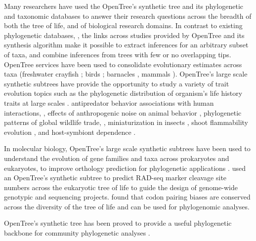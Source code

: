 \documentclass[oupdraft]{sysbio_sse}
\begin{document}
Many researchers have used the OpenTree's synthetic tree and its phylogenetic and taxonomic databases to answer their research questions across the breadth of both the tree of life, and of biological research domains.
In contrast to existing phylogenetic databases, \citep{piel2000treebase}, the links across studies provided by OpenTree and its synthesis algorithm make it possible to extract inferences for an arbitrary subset of taxa, and combine inferences from trees with few or no overlapping tips.
OpenTree services have been used to consolidate evolutionary estimates across taxa (freshwater crayfish \citep{owen2015synthetic}; birds \citep{brown2017development}; barnacles \citep{ewers2019towards, ewers2019testing}, mammals \citep{uyeda2017evolution}).
OpenTree's large scale synthetic subtrees have provide the opportunity to study
a variety of trait evolution topics such as the phylogenetic distribution of organism's life history traits at large scales \citep{tarka2018sex, healy2019animal, capdevila2020longevity}.
antipredator behavior associations with human interactions, \citep{geffroy2020evolutionary}, effects of anthropogenic noise on
animal behavior  \citep{kunc2019effects}, phylogenetic patterns of global wildlife trade,  \citep{fukushima2020global},  miniaturization in insects \citep{polilov2017scaling},
shoot flammability evolution \citep{cui2020shoot}, and host-symbiont dependence \citep{fisher2017evolution}.

In molecular biology, OpenTree's large scale synthetic subtrees
have been used to understand the evolution of gene families and taxa across prokaryotes and eukaryotes, to improve orthology prediction for phylogenetic applications  \citet{boeckmann2015quest}.
\citet{herrera2015predicting} used an OpenTree's synthetic subtree to predict RAD-seq marker cleavage site numbers
across the eukaryotic tree of life to guide the design of genome-wide genotypic and
sequencing projects. \citet{miller2020codonpairs} found that codon pairing biases are conserved across the diversity of the tree of life and can be used for phylogenomic analyses.

OpenTree's synthetic tree has been proved to provide a useful phylogenetic backbone for community phylogenetic analyses \citep{li2019common, jantzen2019effects}.


\end{document}
